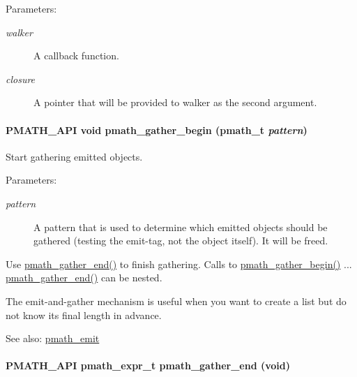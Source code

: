 \begin{Desc}
\item[Parameters:]
\begin{description}
\item[{\em walker}]A callback function. \item[{\em closure}]A pointer that will be provided to walker as the second argument. \end{description}
\end{Desc}
\hypertarget{group__helpers_g077f3730ca4275b87d9a35bce6013e45}{
\paragraph[{pmath\_\-gather\_\-begin}]{\setlength{\rightskip}{0pt plus 5cm}PMATH\_\-API void pmath\_\-gather\_\-begin ({\bf pmath\_\-t} {\em pattern})}\hfill}
\label{group__helpers_g077f3730ca4275b87d9a35bce6013e45}


Start gathering emitted objects. 

\begin{Desc}
\item[Parameters:]
\begin{description}
\item[{\em pattern}]A pattern that is used to determine which emitted objects should be gathered (testing the emit-tag, not the object itself). It will be freed.\end{description}
\end{Desc}
Use \hyperlink{group__helpers_ga2f732b35703986263e3a15592b4a46e}{pmath\_\-gather\_\-end()} to finish gathering. Calls to \hyperlink{group__helpers_g077f3730ca4275b87d9a35bce6013e45}{pmath\_\-gather\_\-begin()} ... \hyperlink{group__helpers_ga2f732b35703986263e3a15592b4a46e}{pmath\_\-gather\_\-end()} can be nested.

The emit-and-gather mechanism is useful when you want to create a list but do not know its final length in advance.

\begin{Desc}
\item[See also:]\hyperlink{group__helpers_ga06135012f4d2a0faf696c0cd1111075}{pmath\_\-emit} \end{Desc}
\hypertarget{group__helpers_ga2f732b35703986263e3a15592b4a46e}{
\paragraph[{pmath\_\-gather\_\-end}]{\setlength{\rightskip}{0pt plus 5cm}PMATH\_\-API {\bf pmath\_\-expr\_\-t} pmath\_\-gather\_\-end (void)}\hfill}
\label{group__helpers_ga2f732b35703986263e3a15592b4a46e}


